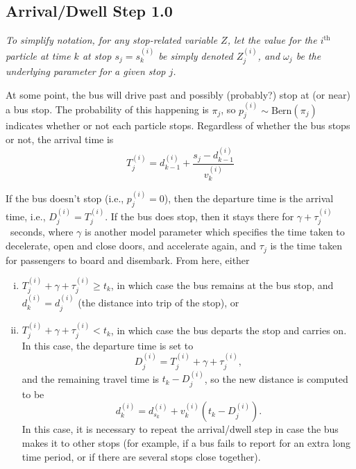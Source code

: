 \documentclass[10pt,a4paper]{article}
\begin{document}
\subsection{Arrival/Dwell Step 1.0}
\label{sec:arr-dwell}

\emph{To simplify notation, for any stop-related variable $Z$, 
let the value for the $i^\mathrm{th}$ particle at time $k$ at stop $s_j = s_k^{(i)}$ 
be simply denoted $Z_j^{(i)}$, and $\omega_j$ be the underlying parameter for a given stop $j$.}

\bigskip\noindent
At some point, the bus will drive past and possibly (probably?) stop at (or near) a bus stop.
The probability of this happening is $\pi_j$, so $p_j^{(i)} \sim \mathrm{Bern}(\pi_j)$ 
indicates whether or not each particle stops.
Regardless of whether the bus stops or not, the arrival time is
\begin{equation}
  \label{eq:arrival_time}
  T_j^{(i)} = d_{k-1}^{(i)} + \frac{s_j - d_{k-1}^{(i)}}{v_k^{(i)}}
\end{equation}

If the bus doesn't stop (i.e., $p_j^{(i)} = 0$), then the departure time is the arrival time,
i.e., $D_j^{(i)} = T_j^{(i)}$.
If the bus does stop, then it stays there for $\gamma + \tau_j^{(i)}$~seconds,
where $\gamma$ is another model parameter which specifies the time taken to decelerate, open and close doors,
and accelerate again, and $\tau_j$ is the time taken for passengers to board and disembark.
From here, either
\begin{enumerate}[i.]
\item 
  $T_j^{(i)} + \gamma + \tau_j^{(i)} \geq t_k$, in which case the bus remains at the bus stop, 
  and $d_k^{(i)} = d_j^{(i)}$ (the distance into trip of the stop), or
\item 
  $T_j^{(i)} + \gamma + \tau_j^{(i)} < t_k$, in which case the bus departs the stop and carries on.
  In this case, the departure time is set to
  \begin{equation}
    \label{eq:departure_time}
    D_j^{(i)} = T_j^{(i)} + \gamma + \tau_j^{(i)},
  \end{equation}
  and the remaining travel time is $t_k - D_j^{(i)}$, so the new distance is computed to be
  \begin{equation}
    \label{eq:distance_after_stopping}
    d_k^{(i)} = d_{s_k}^{(i)} + v_k^{(i)} \left( t_k - D_j^{(i)} \right).
  \end{equation}
  In this case, it is necessary to repeat the arrival/dwell step in case the bus makes it to other stops
  (for example, if a bus fails to report for an extra long time period, or if there are several stops
  close together).
\end{enumerate}
\end{document}
